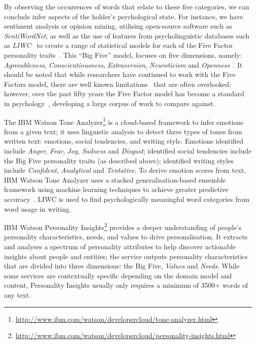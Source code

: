 \documentclass[graybox]{svmult}
\begin{document}
By observing the occurrences of words that relate to these five
categories, we can conclude infer aspects of the holder's
psychological state. For instance, we have sentiment analysis or
opinion mining, utilising open-source software such as
{\emph{SentiWordNet}}; as well as the use of features from
psycholinguistic databases such as
{\emph{LIWC}}~\citep{pennebaker-et-al:2001} to create a range of
statistical models for each of the Five Factor personality
traits~\citep{mairesse-et-al:2007}. This ``Big Five'' model, focuses
on five dimensions, namely: {\emph{Agreeableness}},
{\emph{Conscientiousness}}, {\emph{Extraversion}},
{\emph{Neuroticism}} and
{\emph{Openness}}~\citep{norman:1963,peabody+goldberg:1989}. It
should be noted that while researchers have continued to work with the
Five Factors model, there are well known
limitations~\cite{eysenck:1992,paunonen+jackson:2000,block:2010} that
are often overlooked; however, over the past fifty years the Five Factor
model has become a standard in psychology~\cite{mairesse-et-al:2007},
developing a large corpus of work to compare against.

The IBM Watson Tone
Analyzer\footnote{\url{http://www.ibm.com/watson/developercloud/tone-analyzer.html}}
is a cloud-based framework to infer emotions from a given text; it
uses linguistic analysis to detect three types of tones from written
text: emotions, social tendencies, and writing style. Emotions
identified include {\emph{Anger}}, {\emph{Fear}}, {\emph{Joy}},
{\emph{Sadness}} and {\emph{Disgust}}; identified social tendencies
include the Big Five personality traits (as described above);
identified writing styles include {\emph{Confident}},
{\emph{Analytical}} and {\emph{Tentative}}. To derive emotion scores
from text, IBM Watson Tone Analyzer uses a stacked
generalisation-based ensemble framework using machine learning
techniques to achieve greater predictive
accuracy~\citep{costa+mccrae:1992}. LIWC is used to find
psychologically meaningful word categories from word usage in writing.


IBM Watson Personality
Insights\footnote{\url{http://www.ibm.com/watson/developercloud/personality-insights.html}}
provides a deeper understanding of people's personality
characteristics, needs, and values to drive personalisation. It
extracts and analyses a spectrum of personality attributes to help
discover actionable insights about people and entities; the service
outputs personality characteristics that are divided into three
dimensions: the Big Five, {\emph{Values}} and {\emph{Needs}}. While
some services are contextually specific depending on the domain model
and content, Personality Insights usually only requires a minimum of
3500+ words of any text.
\end{document}

